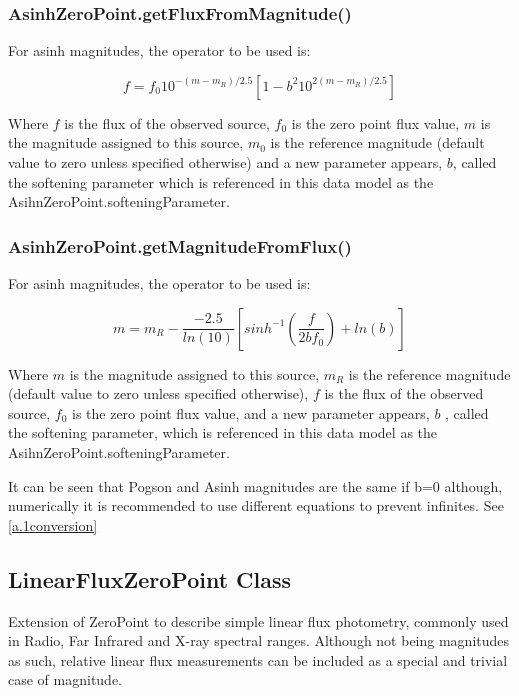 \documentclass[11pt,a4paper]{ivoa}
\begin{document}

\subsubsection{AsinhZeroPoint.getFluxFromMagnitude()}
For asinh magnitudes, the operator to be used is:\par
\begin{equation} \label{eq:27}
f = f_0 10^{-(m-m_R )/2.5} \left[ 1-b^2 10^{2(m-m_R )/2.5}\right]
\end{equation}

Where $f$ is the flux of the observed source, $f_0$ is the zero 
point flux value, $m$ is the magnitude assigned to this source, 
$m_0$ is the reference magnitude (default value to zero unless 
specified otherwise) and a new parameter appears, $b$, called the 
softening parameter which is referenced in this data model as the 
AsihnZeroPoint.softeningParameter.
\par

\subsubsection{AsinhZeroPoint.getMagnitudeFromFlux()}
For asinh magnitudes, the operator to be used is:\par
\begin{equation} \label{eq:28}
m = m_R - \frac{-2.5}{ln(10)}\left[ sinh^{-1}\left (\frac{f}{2bf_0}\right) + ln(b) \right]
\end{equation}

Where $m$ is the magnitude assigned to this source, $m_R$ is the 
reference magnitude (default value to zero unless specified otherwise), 
$f$ is the flux of the observed source, $f_0$ is the zero point flux value, 
and a new parameter appears, $b$ , called the softening parameter, 
which is referenced in this data model as the AsihnZeroPoint.softeningParameter.
\par

It can be seen that Pogson and Asinh magnitudes are the same if b=0 
although, numerically it is recommended to use different equations 
to prevent infinites. See \ref{a.1conversion}
\par

\subsection{LinearFluxZeroPoint Class}
Extension of ZeroPoint  to describe simple linear flux photometry, 
commonly used in Radio, Far Infrared and X-ray spectral ranges. 
Although not being magnitudes as such, relative linear flux measurements 
can be included as a special and trivial case of magnitude.\par
\end{document}
